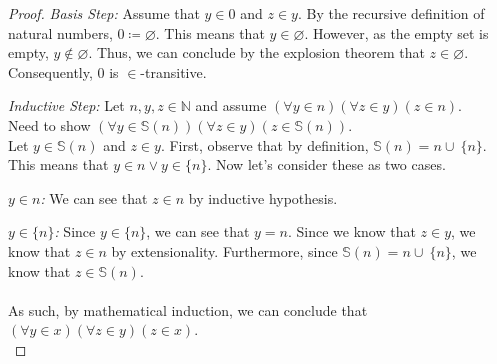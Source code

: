 \documentclass{article}
\newcommand{\Emptyset}{\varnothing}
\newcommand{\union}{\cup\:}
\newcommand{\defeq}{\coloneqq}
\newcommand{\naturals}{\mathbb{N}}
\newcommand{\s}{\mathbb{S}}
\newenvironment{case}[1][Case]
    {\par\textit{#1:}\hfill\break}
    {}
\begin{document}
\begin{enumerate}
\begin{proof}
\begin{case}[Basis Step]
        Assume that $y \in 0$ and $z \in y$. By the recursive definition of natural numbers, $0\defeq \Emptyset$. This means that $y \in \Emptyset$. However, as the empty set is empty, $y \notin \Emptyset$. Thus, we can conclude by the explosion theorem that $z \in \Emptyset$. Consequently, 0 is $\in$-transitive.
    \end{case}
    \begin{case}[Inductive Step]
        Let $n,y,z \in \naturals$ and assume $(\forall y \in n)(\forall z \in y)(z \in n)$.\\
        Need to show $(\forall y \in \s(n))(\forall z \in y)(z \in \s(n))$.\\
        Let $y \in \s(n)$ and $z \in y$. First, observe that by definition, $\s(n)=n\union\{n\}$. This means that $y \in n \lor y \in \{n\}$. Now let's consider these as two cases.\\
        \begin{case}[$y\in n$]
             We can see that $z \in n$ by inductive hypothesis. 
        \end{case}
        \begin{case}[$y \in \{n\}$]
             Since $y \in \{n\}$, we can see that $y=n$. Since we know that $z \in y$, we know that $z \in n$ by extensionality. Furthermore, since $\s(n)=n\union \{n\}$, we know that $z \in \s(n)$.\\\\
        \end{case}
    \end{case}
    As such, by mathematical induction, we can conclude that $(\forall y \in x)(\forall z \in y)(z \in x)$.\\
    \end{proof}
\end{enumerate}
\end{document}

